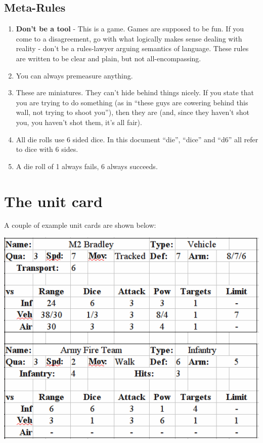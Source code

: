 \documentclass[12pt,titlepage]{article}
\begin{document}
\begin{multicols}{2}
  \subsection{Meta-Rules}
  \begin{enumerate}
  \item {\bf Don't be a tool} - This is a game. Games are supposed to
    be fun. If you come to a disagreement, go with what logically
    makes sense dealing with reality - don't be a rules-lawyer arguing
    semantics of language. These rules are written to be clear and
    plain, but not all-encompassing.
  \item You can always premeasure anything.
  \item These are miniatures. They can't hide behind things nicely. If
    you state that you are trying to do something (as in ``these guys
    are cowering behind this wall, not trying to shoot you''), then
    they are (and, since they haven't shot you, you haven't shot them,
    it's all fair).
  \item All die rolls use 6 sided dice. In this document ``die'',
    ``dice'' and ``d6'' all refer to dice with 6 sides.
  \item A die roll of 1 always fails, 6 always succeeds.
  \end{enumerate}

  \end{multicols}

  \section{The unit card}
  
  A couple of example unit cards are shown below:

  \begin{center}
    \includegraphics[scale=0.75]{cards.png}
  \end{center}
\end{document}
